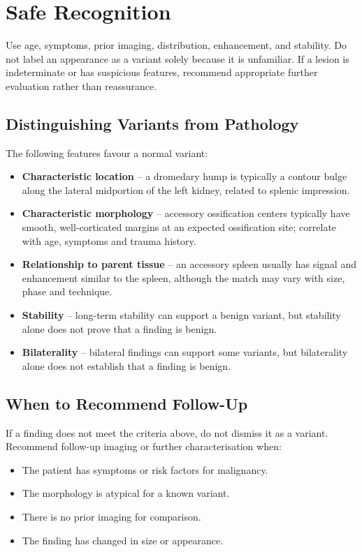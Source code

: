 \section{Safe Recognition}
Use age, symptoms, prior imaging, distribution, enhancement, and stability. Do not label an appearance as a variant solely because it is unfamiliar. If a lesion is indeterminate or has suspicious features, recommend appropriate further evaluation rather than reassurance.

\subsection{Distinguishing Variants from Pathology}
The following features favour a normal variant:
\begin{itemize}
    \item \textbf{Characteristic location} -- a dromedary hump is typically a contour bulge along the lateral midportion of the left kidney, related to splenic impression.
    \item \textbf{Characteristic morphology} -- accessory ossification centers typically have smooth, well-corticated margins at an expected ossification site; correlate with age, symptoms and trauma history.
    \item \textbf{Relationship to parent tissue} -- an accessory spleen usually has signal and enhancement similar to the spleen, although the match may vary with size, phase and technique.
    \item \textbf{Stability} -- long-term stability can support a benign variant, but stability alone does not prove that a finding is benign.
    \item \textbf{Bilaterality} -- bilateral findings can support some variants, but bilaterality alone does not establish that a finding is benign.
\end{itemize}

\subsection{When to Recommend Follow-Up}
If a finding does not meet the criteria above, do not dismiss it as a variant. Recommend follow-up imaging or further characterisation when:
\begin{itemize}
    \item The patient has symptoms or risk factors for malignancy.
    \item The morphology is atypical for a known variant.
    \item There is no prior imaging for comparison.
    \item The finding has changed in size or appearance.
\end{itemize}

